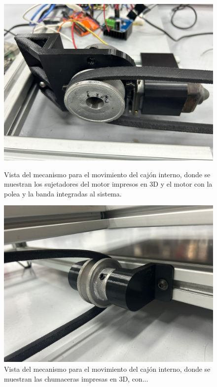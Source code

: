 \begin{figure}[h]
    \centering
    \begin{minipage}{0.49\textwidth}
        \centering
        \includegraphics[width=\textwidth]{MECANISMO/MOTOR_MECANISMO.jpg}
        \caption{Vista del mecanismo para el movimiento del cajón interno, donde se muestran los sujetadores del motor impresos en 3D y el motor con la polea y la banda integradas al sistema.}
        \label{fig:imagen1}
    \end{minipage}%
    \hfill
    \begin{minipage}{0.49\textwidth}
        \centering
        \includegraphics[width=\textwidth]{MECANISMO/MECANISMO_CHUMACERAS.jpg}
        \caption{Vista del mecanismo para el movimiento del cajón interno, donde se muestran las chumaceras impresas en 3D, con...}

\end{minipage}
\end{figure}
